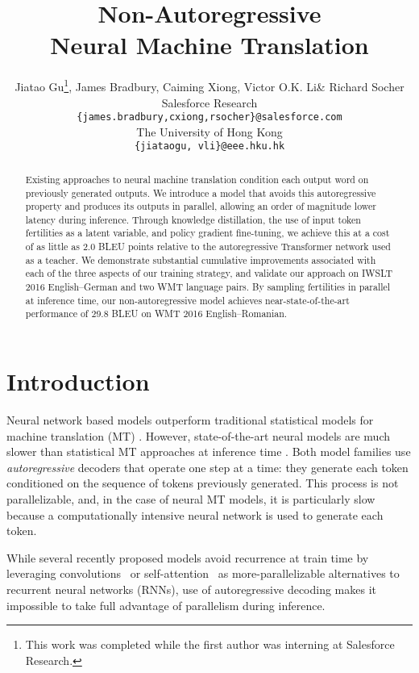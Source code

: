 \documentclass{article} \usepackage{iclr2018_conference,times}
\title{Non-Autoregressive \\Neural Machine Translation}
\author{Jiatao Gu\hku\thanks{This work was completed while the first author was interning at Salesforce Research.}, James Bradbury\mm, Caiming Xiong\mm, Victor O.K. Li\hku \& Richard Socher\mm\\
{\mm}Salesforce Research\\
\texttt{\{james.bradbury,cxiong,rsocher\}@salesforce.com} \\
{\hku}The University of Hong Kong\\
\texttt{\{jiataogu, vli\}@eee.hku.hk} 
}
\begin{document}
\def \model{NAT}

\maketitle

\begin{abstract}
Existing approaches to neural machine translation condition each output word on previously generated outputs. We introduce a model that avoids this autoregressive property and produces its outputs in parallel, allowing an order of magnitude lower latency during inference.
Through knowledge distillation, the use of input token fertilities as a latent variable, and policy gradient fine-tuning, we achieve this at a cost of as little as 2.0 BLEU points relative to the autoregressive Transformer network used as a teacher.
We demonstrate substantial cumulative improvements associated with each of the three aspects of our training strategy, and validate our approach on IWSLT 2016 English--German and two WMT language pairs. By sampling fertilities in parallel at inference time, our non-autoregressive model achieves near-state-of-the-art performance of 29.8 BLEU on WMT 2016 English--Romanian.

\end{abstract}

\section{Introduction}
Neural network based models outperform traditional statistical models for machine translation (MT) \citep{bahdanau2014neural,luong2015effective}. 
However, state-of-the-art neural models are much slower than statistical MT approaches at inference time \citep{wu2016google}.
Both model families use \emph{autoregressive} decoders that operate one step at a time: they generate each token conditioned on the sequence of tokens previously generated. This process is not parallelizable, and, in the case of neural MT models, it is particularly slow because a computationally intensive neural network is used to generate each token.

While several recently proposed models avoid recurrence at train time by leveraging convolutions~\citep{kalchbrenner2016neural, gehring2017convolutional, kaiser2017depthwise} or self-attention~\citep{vaswani2017attention} as more-parallelizable alternatives to recurrent neural networks (RNNs), use of autoregressive decoding makes it impossible to take full advantage of parallelism during inference.
\end{document}
